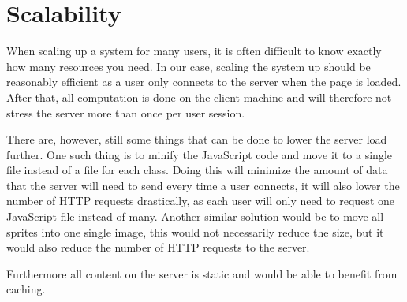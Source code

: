 \section{Scalability}
When scaling up a system for many users, it is often difficult to know exactly how many resources you need. In our case, scaling the system up should be reasonably efficient as a user only connects to the server when the page is loaded. After that, all computation is done on the client machine and will therefore not stress the server more than once per user session.\newline

There are, however, still some things that can be done to lower the server load further. One such thing is to minify the JavaScript code and move it to a single file instead of a file for each class. Doing this will minimize the amount of data that the server will need to send every time a user connects, it will also lower the number of HTTP requests drastically, as each user will only need to request one JavaScript file instead of many. Another similar solution would be to move all sprites into one single image, this would not necessarily reduce the size, but it would also reduce the number of HTTP requests to the server.\newline

Furthermore all content on the server is static and would be able to benefit from caching. 